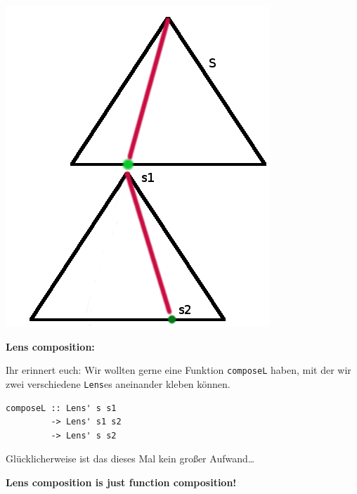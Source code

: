 \documentclass{beamer}
\begin{document}

\begin{frame}[fragile]

\begin{multicols}{2}
\includegraphics[scale=0.4]{lenses_compose.png} 

\columnbreak

\textbf{Lens composition:}\smallskip

Ihr erinnert euch: Wir wollten gerne eine Funktion \texttt{composeL} haben, mit der wir
zwei verschiedene \texttt{Lens}es aneinander kleben können. 

\begin{verbatim}
composeL :: Lens' s s1 
         -> Lens' s1 s2
         -> Lens' s s2
\end{verbatim}

Glücklicherweise ist das dieses Mal kein großer Aufwand\dots

\pause

\textbf{Lens composition is just function composition!}

\end{multicols}
\end{frame}

\end{document}
